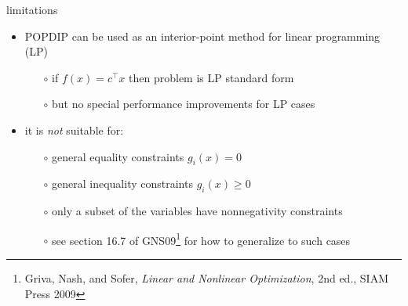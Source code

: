 \documentclass[10pt,hyperref,dvipsnames]{beamer}
\begin{document}
\begin{frame}{limitations}

\begin{itemize}
\item POPDIP can be used as an interior-point method for linear programming (LP)
    \begin{itemize}
    \item[$\circ$] if $f(x)=c^\top x$ then problem is LP standard form
    \item[$\circ$] but no special performance improvements for LP cases
    \end{itemize}

\medskip
\item it is \emph{not} suitable for:
    \begin{itemize}
    \item[$\circ$] general equality constraints $g_i(x)=0$
    \item[$\circ$] general inequality constraints $g_i(x)\ge 0$
    \item[$\circ$] only a subset of the variables have nonnegativity constraints
    \item[$\circ$] see section 16.7 of GNS09\footnote{Griva, Nash, and Sofer, \emph{Linear and Nonlinear Optimization}, 2nd ed., SIAM Press 2009} for how to generalize to such cases
    \end{itemize}
\end{itemize}
\end{frame}
\end{document}
